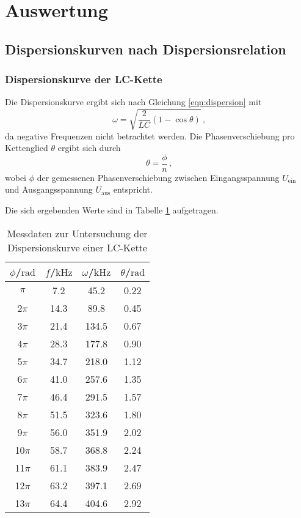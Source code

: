 \section{Auswertung}
\label{sec:Auswertung}

\FloatBarrier
\subsection{Dispersionskurven nach Dispersionsrelation}

\subsubsection{Dispersionskurve der LC-Kette}
Die Dispersionskurve ergibt sich nach Gleichung \eqref{eqn:dispersion} mit 
\begin{equation}
	\label{eqn:dispisi}
	\omega = \sqrt{\frac{2}{LC}(1-\cos\theta)} \, \text{,}
\end{equation}
da negative Frequenzen nicht betrachtet werden.
Die Phasenverschiebung pro Kettenglied $\theta$ ergibt sich durch 
\begin{equation}
	\theta = \frac{\phi}{n} \, \text{,}
\end{equation}
wobei $\phi$ der gemessenen Phasenverschiebung zwischen Eingangsspannung $U_{\text{ein}}$
und Ausgangsspannung $U_{\text{aus}}$ entspricht.

Die sich ergebenden Werte sind in Tabelle \ref{tab:dispersionlc} aufgetragen.

\begin{table}
	\caption{Messdaten zur Untersuchung der Dispersionskurve einer LC-Kette}
	\label{tab:dispersionlc}
	\centering
	\begin{tabular}{cccc}
	\toprule
	$\phi$/$\si{\radian}$ & $f$/$\si{\kilo\Hz}$ & $\omega$/$\si{\kilo\Hz}$ & $\theta$/$\si{\radian}$ \\
	\midrule
		$\pi$ & 7.2 & 45.2 & 0.22 \\
		2$\pi$ & 14.3 & 89.8 & 0.45 \\
		3$\pi$ & 21.4 & 134.5 & 0.67 \\
		4$\pi$ & 28.3 & 177.8 & 0.90 \\
		5$\pi$ & 34.7 & 218.0 & 1.12 \\
		6$\pi$ & 41.0 & 257.6 & 1.35 \\
		7$\pi$ & 46.4 & 291.5 & 1.57 \\
		8$\pi$ & 51.5 & 323.6 & 1.80 \\
		9$\pi$ & 56.0 & 351.9 & 2.02 \\
		10$\pi$ & 58.7 & 368.8 & 2.24 \\
		11$\pi$ & 61.1 & 383.9 & 2.47 \\
		12$\pi$ & 63.2 & 397.1 & 2.69 \\
		13$\pi$ & 64.4 & 404.6 & 2.92 \\
	\bottomrule
	\end{tabular}
\end{table}

